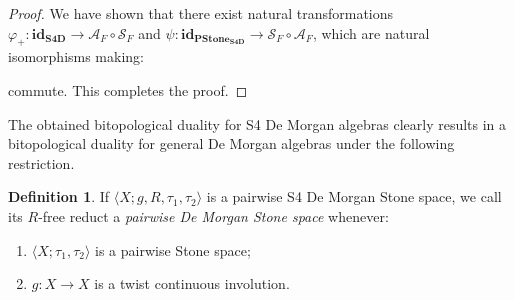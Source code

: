 \documentclass{amsart}
\theoremstyle{plain}
\newcommand{\tuple}[1]{\ensuremath{\langle{#1}\rangle}}
\theoremstyle{definition}
\newtheorem{definition}[theorem]{Definition}
\begin{document}
\begin{proof}
    We have shown that there exist natural transformations $\varphi_+:\mathbf{id}_{\textbf{S4D}} \to \mathcal{A}_F \circ \mathcal{S}_F$ and $\psi:\textbf{id}_{\mathbf{PStone_{S4D}}} \to \mathcal{S}_F \circ \mathcal{A}_F$, which are natural isomorphisms making: 


\centering
\hspace{6pt}

commute. This completes the proof.  
\end{proof}
The obtained bitopological duality for S4 De Morgan algebras clearly results in a bitopological duality for general De Morgan algebras under the following restriction. 
\begin{definition}\label{pairwise de morgan stone space}
    If $\langle X;g,R,\tau_1,\tau_2\rangle$ is a pairwise S4 De Morgan Stone space, we call its $R$-free reduct a \emph{pairwise De Morgan Stone space} whenever: 
    \begin{enumerate}
        \item $\tuple{X;\tau_1,\tau_2}$ is a pairwise Stone space; 
        \item $g\colon X\to X$ is a twist continuous involution. 
    \end{enumerate}
\end{definition}
\end{document}
